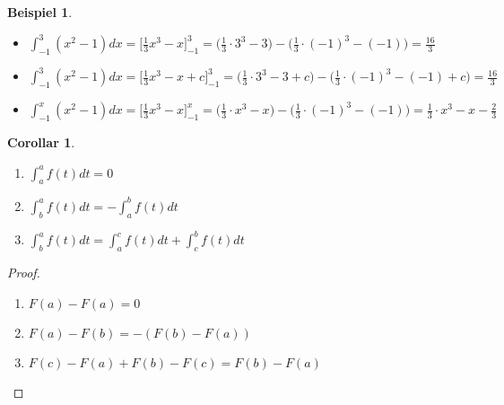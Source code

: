\documentclass[a4paper,12pt,pointlessnumbers]{scrreprt}
\theoremstyle{definition}
\newtheorem{example}[definition]{Beispiel}
\newtheorem{Corollar}[definition]{Corollar}
\begin{document}
\newpage
\begin{example}
\begin{itemize}
\item \(\int_{-1}^3 (x^2-1) dx = \bigl[\frac{1}{3}x^3-x\bigr]_{-1}^{3}= \bigl(\frac{1}{3}\cdot 3^3-3\bigr)-\bigl(\frac{1}{3}\cdot(-1)^3-(-1)\bigr)=
\frac{16}{3}\)
\item \(\int_{-1}^3 (x^2-1) dx = \bigl[\frac{1}{3}x^3-x+c\bigr]_{-1}^{3}= \bigl(\frac{1}{3}\cdot 3^3-3+c\bigr)-\bigl(\frac{1}{3}\cdot(-1)^3-(-1)+c\bigr)=
\frac{16}{3}\)
\item \(\int_{-1}^x (x^2-1) dx = \bigl[\frac{1}{3}x^3-x\bigr]_{-1}^{x}= \bigl(\frac{1}{3}\cdot x^3-x\bigr)-\bigl(\frac{1}{3}\cdot(-1)^3-(-1)\bigr)=\frac{1}{3}\cdot x^3-x-\frac{2}{3}
\)
\end{itemize}
\end{example}

\begin{Corollar}
\begin{enumerate}
\item $\int_a^a f(t) dt = 0$ 
\item $\int_b^a f(t) dt = - \int_a^b f(t) dt$ 
\item $\int_b^a f(t) dt = \int_a^c f(t) dt + \int_c^b f(t) dt$
\end{enumerate}
\end{Corollar}

\begin{proof}
\begin{enumerate}
\item $F(a)-F(a)=0$
\item $F(a)-F(b)=-(F(b)-F(a))$
\item $F(c)-F(a)+F(b)-F(c)=F(b)-F(a)$
\end{enumerate}
\end{proof}
\end{document}
